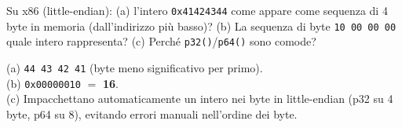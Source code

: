 \question[5]
Su x86 (little-endian): (a) l'intero \lstinline|0x41424344| come appare come sequenza di 4 byte in memoria (dall'indirizzo più basso)? (b) La sequenza di byte \lstinline|10 00 00 00| quale intero rappresenta? (c) Perché \lstinline|p32()|/\lstinline|p64()| sono comode?
\begin{solution}
(a) \lstinline|44 43 42 41| (byte meno significativo per primo).\\
(b) \lstinline|0x00000010| $=$ \textbf{16}.\\
(c) Impacchettano automaticamente un intero nei byte in little-endian (p32 su 4 byte, p64 su 8), evitando errori manuali nell'ordine dei byte.
\end{solution}
